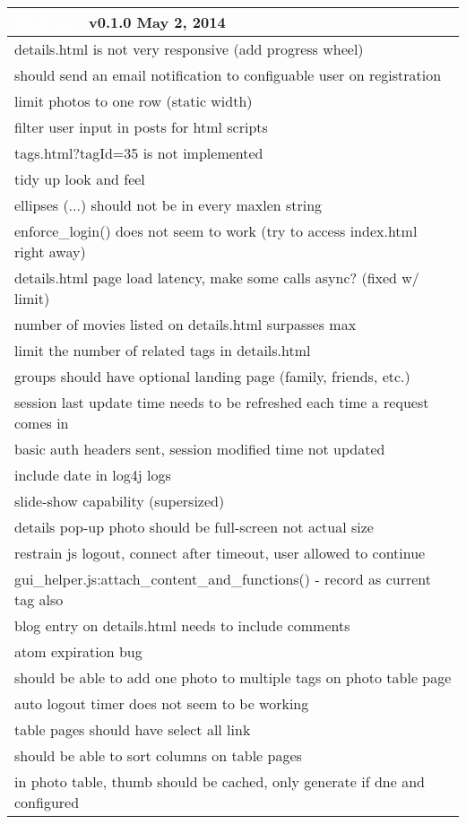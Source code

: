 \documentclass[notitlepage]{article}
\newcommand{\releasedate}{May 2, 2014}
\begin{document}
\begin{center}
\begin{tabular}{ | l | }
\hline
\LARGE\cellcolor{myblue}\textcolor{white}{khallware} v0.1.0 \releasedate{} \\
\hline
details.html is not very responsive (add progress wheel) \\
\hline
should send an email notification to configuable user on registration \\
\hline
limit photos to one row (static width) \\
\hline
filter user input in posts for html scripts \\
\hline
tags.html?tagId=35 is not implemented \\
\hline
tidy up look and feel \\
\hline
ellipses (...) should not be in every maxlen string \\
\hline
enforce\_login() does not seem to work (try to access index.html right away) \\
\hline
details.html page load latency, make some calls async? (fixed w/ limit) \\
\hline
number of movies listed on details.html surpasses max \\
\hline
limit the number of related tags in details.html \\
\hline
groups should have optional landing page (family, friends, etc.) \\
\hline
session last update time needs to be refreshed each time a request comes in \\
\hline
basic auth headers sent, session modified time not updated \\
\hline
include date in log4j logs \\
\hline
slide-show capability (supersized) \\
\hline
details pop-up photo should be full-screen not actual size \\
\hline
restrain js logout, connect after timeout, user allowed to continue \\
\hline
gui\_helper.js:attach\_content\_and\_functions() - record as current tag also \\
\hline
blog entry on details.html needs to include comments \\
\hline
atom expiration bug \\
\hline
should be able to add one photo to multiple tags on photo table page \\
\hline
auto logout timer does not seem to be working \\
\hline
table pages should have select all link \\
\hline
should be able to sort columns on table pages \\
\hline
in photo table, thumb should be cached, only generate if dne and configured \\
\hline

\end{tabular}
\end{center}
\end{document}
